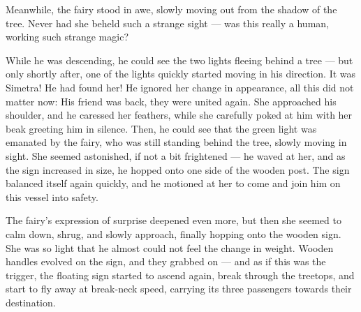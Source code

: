 Meanwhile, the fairy stood in awe, slowly moving out from the shadow of the tree. Never had she beheld such a strange sight --- was this really a human, working such strange magic?

\fancybreaker{}

While he was descending, he could see the two lights fleeing behind a tree --- but only shortly after, one of the lights quickly started moving in his direction. It was Simetra! He had found her! 
He ignored her change in appearance, all this did not matter now: His friend was back, they were united again. She approached his shoulder, and he caressed her feathers, while she carefully poked at him with her beak greeting him in silence. Then, he could see that the green light was emanated by the fairy, who was still standing behind the tree, slowly moving in sight. She seemed astonished, if not a bit frightened --- he waved at her, and as the sign increased in size, he hopped onto one side of the wooden post. The sign balanced itself again quickly, and he motioned at her to come and join him on this vessel into safety.

The fairy's expression of surprise deepened even more, but then she seemed to calm down, shrug, and slowly approach, finally hopping onto the wooden sign. She was so light that he almost could not feel the change in weight. Wooden handles evolved on the sign, and they grabbed on --- and as if this was the trigger, the floating sign started to ascend again, break through the treetops, and start to fly away at break-neck speed, carrying its three passengers towards their destination.
